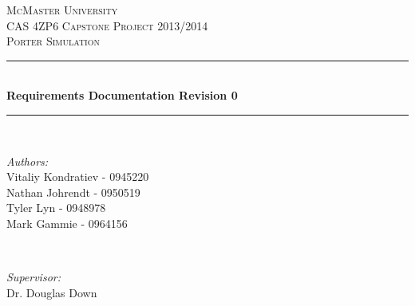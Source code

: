 \documentclass[paper=letter, fontsize=10pt]{scrartcl}
\numberwithin{equation}{section}		%
\numberwithin{figure}{section}			%
\numberwithin{table}{section}				%
\begin{document}
\begin{titlepage}

\newcommand{\HRule}{\rule{\linewidth}{0.5mm}} %

\begin{center}
 

\textsc{\LARGE McMaster University}\\[1.5cm] %
\textsc{\Large CAS 4ZP6 Capstone Project 2013/2014}\\[0.5cm] %
\textsc{\large Porter Simulation}\\[0.5cm] %


\HRule \\[0.4cm]
{ \huge \bfseries Requirements Documentation Revision 0}\\[0.4cm] %
\HRule \\[1.5cm]
 

\begin{minipage}{0.4\textwidth}
\begin{flushleft} \large
\emph{Authors:}\\
Vitaliy Kondratiev - 0945220\\
Nathan Johrendt - 0950519\\
Tyler Lyn - 0948978\\
Mark Gammie - 0964156
\end{flushleft}
\end{minipage}
~
\begin{minipage}{0.4\textwidth}
\begin{flushright} \large
\emph{Supervisor:} \\
Dr. Douglas Down %
\end{flushright}
\end{minipage}\\[4cm]


\end{center}
\end{titlepage}
\end{document}
